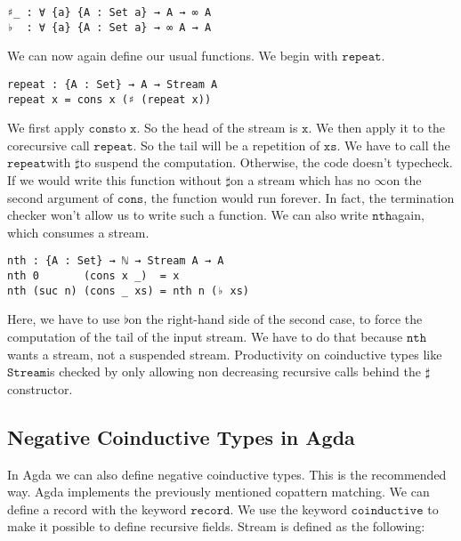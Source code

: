 \documentclass[a4paper,cleardoubleempty,BCOR1cm]{scrbook}
\begin{document}
\begin{verbatim}
♯_ : ∀ {a} {A : Set a} → A → ∞ A
♭  : ∀ {a} {A : Set a} → ∞ A → A
\end{verbatim}

We can now again define our usual functions.  We begin with $\mathtt{repeat}$.

\begin{verbatim}
repeat : {A : Set} → A → Stream A
repeat x = cons x (♯ (repeat x))
\end{verbatim}

We first apply $\mathtt{cons}$\;to $\mathtt{x}$. So the head of the stream is $\mathtt{x}$. We then apply
it to the corecursive call $\mathtt{repeat}$. So the tail will be a repetition of
$\mathtt{xs}$. We have to call the $\mathtt{repeat}$\;with $\mathtt{\sharp}$\;to suspend the computation.
Otherwise, the code doesn't typecheck. If we would write this function
without $\mathtt{\sharp}$\;on a stream which has no $\mathtt{\infty}$\;on the second argument of
$\mathtt{cons}$, the function would run forever. In fact, the termination checker won't
allow us to write such a function. We can also write $\mathtt{nth}$\;again, which
consumes a stream.

\begin{verbatim}
nth : {A : Set} → ℕ → Stream A → A
nth 0       (cons x _)  = x
nth (suc n) (cons _ xs) = nth n (♭ xs)
\end{verbatim}

Here, we have to use $\mathtt{\flat}$\;on the right-hand side of the second case, to
force the computation of the tail of the input stream.  We have to do that
because $\mathtt{nth}$\;wants a stream, not a suspended stream.
Productivity on coinductive types like $\mathtt{Stream}$\;is checked by only allowing non
decreasing recursive calls behind the $\mathtt{\sharp}$\;constructor.

\subsection{Negative Coinductive Types in Agda}
\label{sec:org95ffc71}
In Agda we can also define negative coinductive types.  This is the
recommended way.  Agda implements the previously mentioned copattern matching.
We can define a record with the keyword $\mathtt{record}$.  We use the keyword $\mathtt{coinductive}$
to make it possible to define recursive fields.  Stream is defined as the
following:
\end{document}
